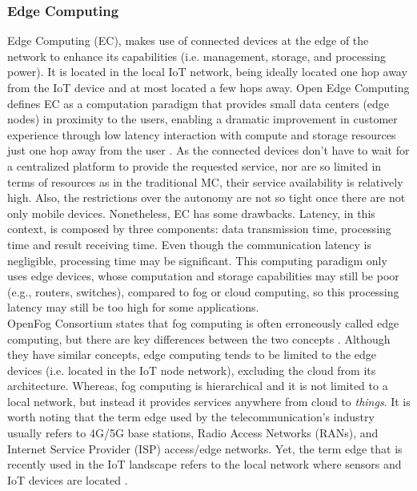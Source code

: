 \subsubsection{Edge Computing}
\noindent Edge Computing (EC), makes use of connected devices at the edge of the network to enhance its capabilities (i.e. management, storage, and processing power). It is located in the local IoT network, being ideally located one hop away from the IoT device and at most located a few hops away. Open Edge Computing defines EC as a computation paradigm that provides small data centers (edge nodes) in proximity to the users, enabling a dramatic improvement in customer experience through low latency interaction with compute and storage resources just one hop away from the user \cite{OpenEdge73:online}. As the connected devices don't have to wait for a centralized platform to provide the requested service, nor are so limited in terms of resources as in the traditional MC, their service availability is relatively high. Also, the restrictions over the autonomy are not so tight once there are not only mobile devices. Nonetheless, EC has some drawbacks. Latency, in this context, is composed by three components: data transmission time, processing time and result receiving time. Even though the communication latency is negligible, processing time may be significant. This computing paradigm only uses edge devices, whose computation and storage capabilities may still be poor (e.g., routers, switches), compared to fog or cloud computing, so this processing latency may still be too high for some applications.\\
\noindent\tab OpenFog Consortium states that fog computing is often erroneously called edge computing, but there are key differences between the two concepts \cite{OpenFog0208}. Although they have similar concepts, edge computing tends to be limited to the edge devices (i.e. located in the IoT node network), excluding the cloud from its architecture. Whereas, fog computing is hierarchical and it is not limited to a local network, but instead it provides services anywhere from cloud to \textit{things}. It is worth noting that the term edge used by the telecommunication's industry usually refers to 4G/5G base stations, Radio Access Networks (RANs), and Internet Service Provider (ISP) access/edge networks. Yet, the term edge that is recently used in the IoT landscape refers to the local network where sensors and IoT devices are located \cite{yousefpour2018all}.

